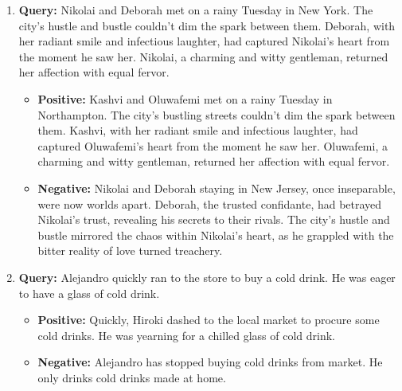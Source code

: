 
\begin{enumerate}
    \item \textbf{Query:} {Nikolai} and {Deborah} met on a rainy Tuesday in {New York}. The city’s hustle and bustle couldn’t dim the spark between them. {Deborah}, with her radiant smile and infectious laughter, had captured {Nikolai}'s heart from the moment he saw her. {Nikolai}, a charming and witty gentleman, returned her affection with equal fervor.
        \begin{itemize}

            \item \textbf{Positive:} {Kashvi} and {Oluwafemi} met on a rainy Tuesday in {Northampton}. The city’s bustling streets couldn’t dim the spark between them. {Kashvi}, with her radiant smile and infectious laughter, had captured {Oluwafemi}’s heart from the moment he saw her. {Oluwafemi}, a charming and witty gentleman, returned her affection with equal fervor.

            \item \textbf{Negative:} {Nikolai} and {Deborah} staying in {New Jersey}, once inseparable, were now worlds apart. {Deborah}, the trusted confidante, had betrayed {Nikolai}'s trust, revealing his secrets to their rivals. The city's hustle and bustle mirrored the chaos within {Nikolai}'s heart, as he grappled with the bitter reality of love turned treachery.
        \end{itemize}



    \item \textbf{Query:}  Alejandro quickly ran to the store to buy a cold drink. He was eager to have a glass of cold drink.
        \begin{itemize}
            \item \textbf{Positive:} Quickly, Hiroki dashed to the local market to procure some cold drinks. He was yearning for a chilled glass of cold drink.
            \item \textbf{Negative:} Alejandro has stopped buying cold drinks from market. He only drinks cold drinks made at home.
        \end{itemize}



\end{enumerate}
